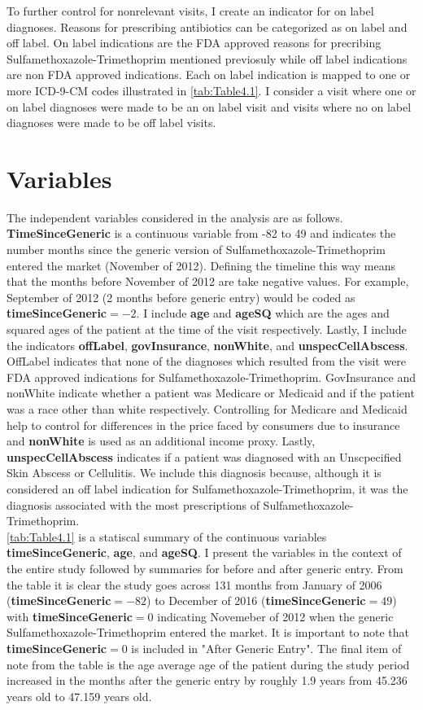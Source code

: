 \indent To further control for nonrelevant visits, I create an indicator for on label diagnoses. Reasons for prescribing antibiotics can be categorized as on label and off label. On label indications are the FDA approved reasons for precribing Sulfamethoxazole-Trimethoprim mentioned previosuly while off label indications are non FDA approved indications. Each on label indication is mapped to one or more ICD-9-CM codes illustrated in \autoref{tab:Table4.1}. I consider a visit where one or on label diagnoses were made to be an on label visit and visits where no on label diagnoses were made to be off label visits. 

\section{Variables}
The independent variables considered in the analysis are as follows. \textbf{TimeSinceGeneric} is a continuous variable from -82 to 49 and indicates the number months since the generic version of Sulfamethoxazole-Trimethoprim entered the market (November of 2012). Defining the timeline this way means that the months before November of 2012 are take negative values. For example, September of 2012 (2 months before generic entry) would be coded as \textbf{timeSinceGeneric}$=-2$. I include \textbf{age} and \textbf{ageSQ} which are the ages and squared ages of the patient at the time of the visit respectively. Lastly, I include the indicators \textbf{offLabel}, \textbf{govInsurance}, \textbf{nonWhite}, and \textbf{unspecCellAbscess}. OffLabel indicates that none of the diagnoses which resulted from the visit were FDA approved indications for Sulfamethoxazole-Trimethoprim. GovInsurance and nonWhite indicate whether a patient was Medicare or Medicaid and if the patient was a race other than white respectively. Controlling for Medicare and Medicaid help to control for differences in the price faced by consumers due to insurance and \textbf{nonWhite} is used as an additional income proxy. Lastly, \textbf{unspecCellAbscess} indicates if a patient was diagnosed with an Unscpecified Skin Abscess or Cellulitis. We include this diagnosis because, although it is considered an off label indication for Sulfamethoxazole-Trimethoprim, it was the diagnosis associated with the most prescriptions of Sulfamethoxazole-Trimethoprim.\\
\indent \autoref{tab:Table4.1} is a statiscal summary of the continuous variables \textbf{timeSinceGeneric}, \textbf{age}, and \textbf{ageSQ}. I present the variables in the context of the entire study followed by summaries for before and after generic entry. From the table it is clear the study goes across 131 months from January of 2006 (\textbf{timeSinceGeneric}$=-82$) to December of 2016 (\textbf{timeSinceGeneric}$=49$) with \textbf{timeSinceGeneric}$=0$ indicating Novemeber of 2012 when the generic Sulfamethoxazole-Trimethoprim entered the market. It is important to note that \textbf{timeSinceGeneric}$=0$ is included in "After Generic Entry". The final item of note from the table is the age average age of the patient during the study period increased in the months after the generic entry by roughly 1.9 years from 45.236 years old to 47.159 years old.\\
